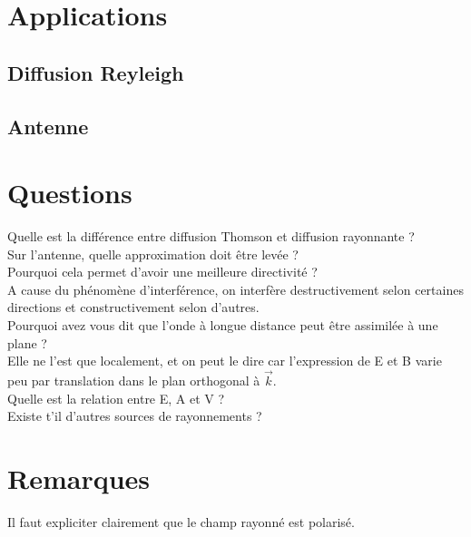 \documentclass[12pt,prb,aps,epsf]{report}
\begin{document}
\section{Applications}
\subsection{Diffusion Reyleigh}
\subsection{Antenne}

\section*{Questions}
Quelle est la différence entre diffusion Thomson et diffusion rayonnante ?\\

Sur l'antenne, quelle approximation doit être levée ?\\

Pourquoi cela permet d'avoir une meilleure directivité ?\\
A cause du phénomène d'interférence, on interfère destructivement selon certaines directions et constructivement selon d'autres.\\

Pourquoi avez vous dit que l'onde à longue distance peut être assimilée à une plane ?\\
Elle ne l'est que localement, et on peut le dire car l'expression de E et B varie peu par translation dans le plan orthogonal à $\vec{k}$.\\


Quelle est la relation entre E, A et V ?\\

Existe t'il d'autres sources de rayonnements ?\\
	
\section*{Remarques}
	Il faut expliciter clairement que le champ rayonné est polarisé.
	
	
\end{document}
